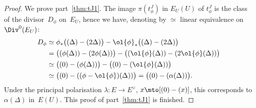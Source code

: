 \begin{proof}
We prove part~\eqref{thm:tJ1}. The image $\pi(t^J_\phi)$ in $E_U(U)$ of
$t^J_\phi$ is the class of the divisor~$D_\phi$ on~$E_U$, hence we
have, denoting by $\simeq$ linear equivalence on $\Div^0(E_U)$:
\begin{align*}
D_\phi & \simeq \phi_*\big((\Delta)-(2\Delta)\big) - \ol{\phi}_*\big((\Delta)-(2\Delta)\big) \\
& = \big((\phi(\Delta))-(2\phi(\Delta))\big) - \big((\ol{\phi}(\Delta))-(2\ol{\phi}(\Delta))\big) \\
& \simeq \big( (0) - (\phi(\Delta))\big) - \big((0) - (\ol{\phi}(\Delta))\big) \\
& \simeq \big((0) - ((\phi-\ol{\phi})(\Delta))\big) = \big((0) - (\alpha(\Delta))\big).
\end{align*}
Under the principal polarisation $\lambda\colon E\to E^\vee$,
$x\mto [(0)-(x)]$, this corresponds to $\alpha(\Delta)$ in~$E(U)$.
This proof of part~\eqref{thm:tJ1} is finished.


\end{proof}
